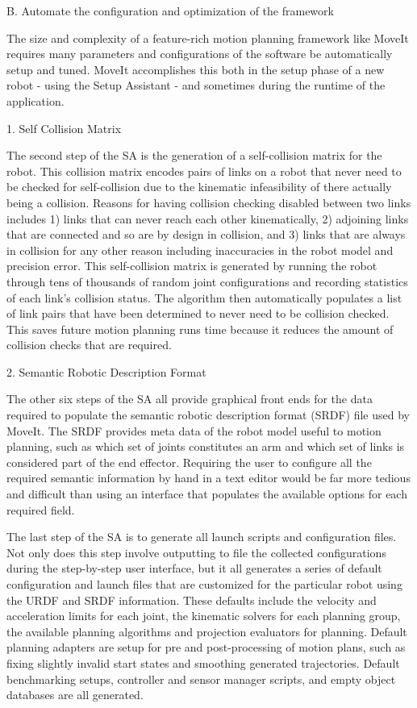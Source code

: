 \documentclass[10pt,journal,compsoc]{joser1}
\begin{document}
{B. Automate the configuration and optimization of the framework

The size and complexity of a feature-rich motion planning framework like MoveIt requires many parameters and configurations of the software be automatically setup and tuned. MoveIt accomplishes this both in the setup phase of a new robot - using the Setup Assistant - and sometimes during the runtime of the application.

1. Self Collision Matrix

The second step of the SA is the generation of a self-collision matrix for the robot. This collision matrix encodes pairs of links on a robot that never need to be checked for self-collision due to the kinematic infeasibility of there actually being a collision. Reasons for having collision checking disabled between two links includes 1) links that can never reach each other kinematically, 2) adjoining links that are connected and so are by design in collision, and 3) links that are always in collision for any other reason including inaccuracies in the robot model and precision error. This self-collision matrix is generated by running the robot through tens of thousands of random joint configurations and recording statistics of each link's collision status. The algorithm then automatically populates a list of link pairs that have been determined to never need to be collision checked. This saves future motion planning runs time because it reduces the amount of collision checks that are required.

2. Semantic Robotic Description Format

The other six steps of the SA all provide graphical front ends for the data required to populate the semantic robotic description format (SRDF) file used by MoveIt. The SRDF provides meta data of the robot model useful to motion planning, such as which set of joints constitutes an arm and which set of links is considered part of the end effector. Requiring the user to configure all the required semantic information by hand in a text editor would be far more tedious and difficult than using an interface that populates the available options for each required field.

The last step of the SA is to generate all launch scripts and configuration files. Not only does this step involve outputting to file the collected configurations during the step-by-step user interface, but it all generates a series of default configuration and launch files that are customized for the particular robot using the URDF and SRDF information. These defaults include the velocity and acceleration limits for each joint, the kinematic solvers for each planning group, the available planning algorithms and projection evaluators for planning. Default planning adapters are setup for pre and post-processing of motion plans, such as fixing slightly invalid start states and smoothing generated trajectories. Default benchmarking setups, controller and sensor manager scripts, and empty object databases are all generated. 

}
\end{document}
